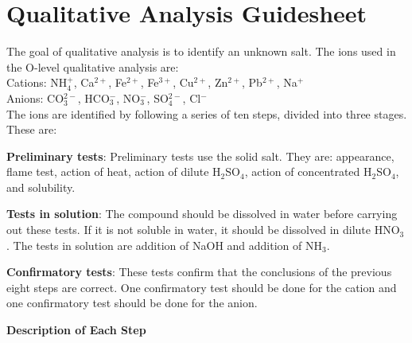 \thispagestyle{empty}

\chapter{Qualitative Analysis Guidesheet}

The goal of qualitative analysis is to identify an unknown salt. The ions used in the O-level qualitative analysis are:\\
Cations: NH$_4^+$, Ca$^{2+}$, Fe$^{2+}$, Fe$^{3+}$, Cu$^{2+}$, Zn$^{2+}$, Pb$^{2+}$, Na$^+$\\
Anions: CO$_3^{2-}$, HCO$_3^-$, NO$_3^-$, SO$_4^{2-}$, Cl$^-$\\
The ions are identified by following a series of ten steps, divided into three stages. These are:
\begin{enumerate*}
\item \textbf{Preliminary tests}: Preliminary tests use the solid salt. They are: appearance, flame test, action of heat, action of dilute H$_2$SO$_4$, action of concentrated H$_2$SO$_4$, and solubility. \hfill
\item \textbf{Tests in solution}: The compound should be dissolved in water before carrying out these tests. If it is not soluble in water, it should be dissolved in dilute HNO$_3$. The tests in solution are addition of NaOH and addition of NH$_3$. \hfill
\item \textbf{Confirmatory tests}: These tests confirm that the conclusions of the previous eight steps are correct. One confirmatory test should be done for the cation and one confirmatory test should be done for the anion.
\end{enumerate*}

\noindent \textbf{Description of Each Step}

